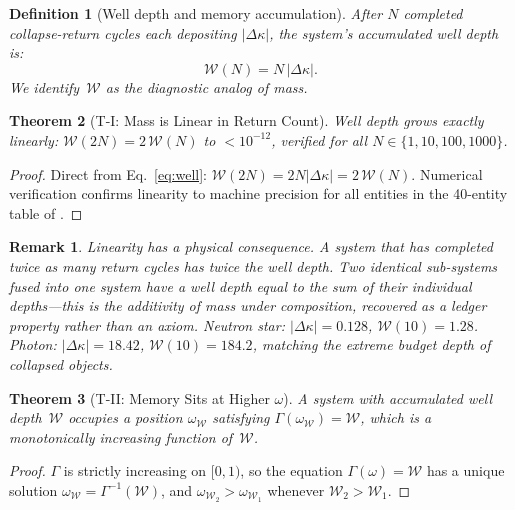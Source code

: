 \documentclass[
  aps,
  prd,
  twocolumn,
  superscriptaddress,
  nofootinbib,
  floatfix
]{revtex4-2}
\newtheorem{theorem}{Theorem}
\newtheorem{definition}[theorem]{Definition}
\newtheorem{remark}{Remark}
\newcommand{\Gam}{\Gamma}
\newcommand{\memwell}{\mathcal{W}}                     %
\begin{document}
\begin{definition}[Well depth and memory accumulation]
\label{def:well}
After $N$ completed collapse-return cycles each depositing
$|\Delta\kappa|$, the system's accumulated well depth is:
\begin{equation}
  \memwell(N) = N\,|\Delta\kappa|.
  \label{eq:well}
\end{equation}
We identify~$\memwell$ as the diagnostic analog of mass.
\end{definition}

\begin{theorem}[T-I: Mass is Linear in Return Count]
\label{thm:T1}
Well depth grows exactly linearly:
$\memwell(2N) = 2\,\memwell(N)$ to $< 10^{-12}$,
verified for all $N \in \{1, 10, 100, 1000\}$.
\end{theorem}

\begin{proof}
Direct from Eq.~\eqref{eq:well}: $\memwell(2N) =
2N|\Delta\kappa| = 2\,\memwell(N)$.  Numerical verification
confirms linearity to machine precision for all entities
in the 40-entity table of \cite{paulus2025physicscoherence}.
\end{proof}

\begin{remark}
Linearity has a physical consequence.  A system that has
completed twice as many return cycles has twice the well
depth.  Two identical sub-systems fused into one system
have a well depth equal to the sum of their individual
depths---this is the additivity of mass under composition,
recovered as a ledger property rather than an axiom.
Neutron star: $|\Delta\kappa| = 0.128$,
$\memwell(10) = 1.28$.
Photon: $|\Delta\kappa| = 18.42$,
$\memwell(10) = 184.2$, matching the extreme budget depth
of collapsed objects.
\end{remark}

\begin{theorem}[T-II: Memory Sits at Higher $\omega$]
\label{thm:T2}
A system with accumulated well depth~$\memwell$ occupies
a position $\omega_\memwell$ satisfying
$\Gam(\omega_\memwell) = \memwell$, which is a
monotonically increasing function of~$\memwell$.
\end{theorem}

\begin{proof}
$\Gam$ is strictly increasing on $[0,1)$, so the equation
$\Gam(\omega) = \memwell$ has a unique solution
$\omega_\memwell = \Gam^{-1}(\memwell)$, and
$\omega_{\memwell_2} > \omega_{\memwell_1}$ whenever
$\memwell_2 > \memwell_1$.
\end{proof}
\end{document}
